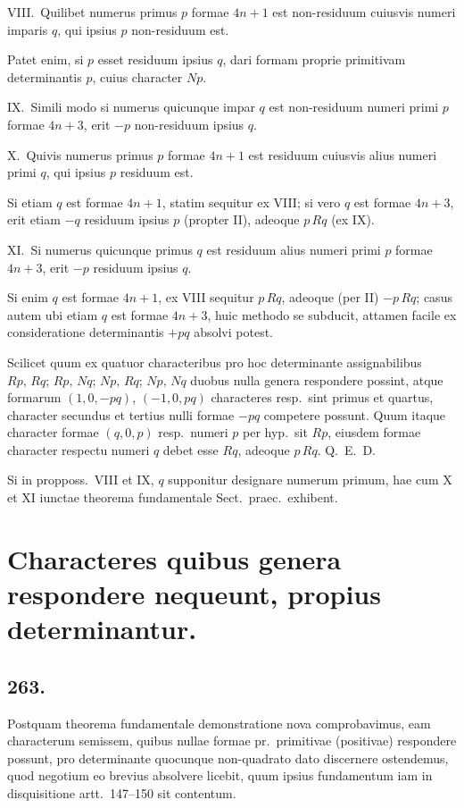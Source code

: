 \documentclass[12pt,a4paper]{article}
\theoremstyle{plain}
\theoremstyle{definition}
\theoremstyle{remark}
\begin{document}
\textsc{VIII.}\ Quilibet numerus primus $p$ formae $4n+1$ est non-residuum cuiusvis numeri imparis $q$, qui ipsius $p$ non-residuum est.

Patet enim, si $p$ esset residuum ipsius $q$, dari formam proprie primitivam determinantis $p$, cuius character $Np$.

\textsc{IX.}\ Simili modo si numerus quicunque impar $q$ est non-residuum numeri primi $p$ formae $4n+3$, erit $-p$ non-residuum ipsius $q$.

\textsc{X.}\ Quivis numerus primus $p$ formae $4n+1$ est residuum cuiusvis alius numeri primi $q$, qui ipsius $p$ residuum est.

Si etiam $q$ est formae $4n+1$, statim sequitur ex VIII; si vero $q$ est formae $4n+3$, erit etiam $-q$ residuum ipsius $p$ (propter II), adeoque $p\,Rq$ (ex IX).

\textsc{XI.}\ Si numerus quicunque primus $q$ est residuum alius numeri primi $p$ formae $4n+3$, erit $-p$ residuum ipsius $q$.

Si enim $q$ est formae $4n+1$, ex VIII sequitur $p\,Rq$, adeoque (per II) $-p\,Rq$; casus autem ubi etiam $q$ est formae $4n+3$, huic methodo se subducit, attamen facile ex consideratione determinantis $+pq$ absolvi potest.

Scilicet quum ex quatuor characteribus pro hoc determinante assignabilibus $Rp,\,Rq$; $Rp,\,Nq$; $Np,\,Rq$; $Np,\,Nq$ duobus nulla genera respondere possint, atque formarum $(1,0,-pq)$, $(-1,0,pq)$ characteres resp.\ sint primus et quartus, character secundus et tertius nulli formae $-pq$ competere possunt. Quum itaque character formae $(q,0,p)$ resp.\ numeri $p$ per hyp.\ sit $Rp$, eiusdem formae character respectu numeri $q$ debet esse $Rq$, adeoque $p\,Rq$. Q.\ E.\ D.

Si in propposs.\ VIII et IX, $q$ supponitur designare numerum primum, hae cum X et XI iunctae theorema fundamentale Sect.\ praec.\ exhibent.

\section*{Characteres quibus genera respondere nequeunt, propius determinantur.}

\subsection*{263.}

Postquam theorema fundamentale demonstratione nova comprobavimus, eam characterum semissem, quibus nullae formae pr.\ primitivae (positivae) respondere possunt, pro determinante quocunque non-quadrato dato discernere ostendemus, quod negotium eo brevius absolvere licebit, quum ipsius fundamentum iam in disquisitione artt.\ 147--150 sit contentum.
\end{document}
